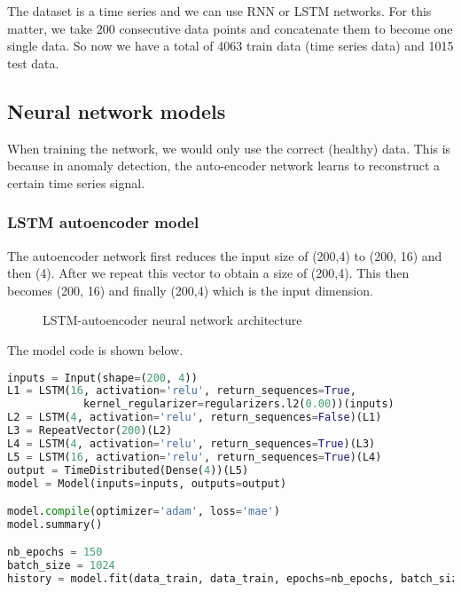 The dataset is a time series and we can use RNN or LSTM networks. For this matter, we take 200 consecutive data points and concatenate them to become one single data. So now we have a total of 4063 train data (time series data) and 1015 test data. 

\subsection*{Neural network models}


When training the network, we would only use the correct (healthy) data. This is because in anomaly detection, the auto-encoder network learns to reconstruct a certain time series signal. 

\subsubsection*{LSTM autoencoder model} The autoencoder network first reduces the input size of (200,4) to (200, 16) and then (4). After we repeat this vector to obtain a size of (200,4). This then becomes (200, 16) and finally (200,4) which is the input dimension. 

\begin{figure}[H]
\centering
{}
\caption{LSTM-autoencoder neural network architecture}
\end{figure}

The model code is shown below. 

\begin{center}{\begin{minipage}{0.9\linewidth}
\begin{lstlisting}[language=Python, basicstyle=\fontsize{10}{10}\selectfont\ttfamily]
inputs = Input(shape=(200, 4))
L1 = LSTM(16, activation='relu', return_sequences=True, 
            kernel_regularizer=regularizers.l2(0.00))(inputs)
L2 = LSTM(4, activation='relu', return_sequences=False)(L1)
L3 = RepeatVector(200)(L2)
L4 = LSTM(4, activation='relu', return_sequences=True)(L3)
L5 = LSTM(16, activation='relu', return_sequences=True)(L4)
output = TimeDistributed(Dense(4))(L5)    
model = Model(inputs=inputs, outputs=output)

model.compile(optimizer='adam', loss='mae')
model.summary()

nb_epochs = 150
batch_size = 1024
history = model.fit(data_train, data_train, epochs=nb_epochs, batch_size=batch_size, validation_split=0.05).history
\end{lstlisting}
\end{minipage}}\end{center}

